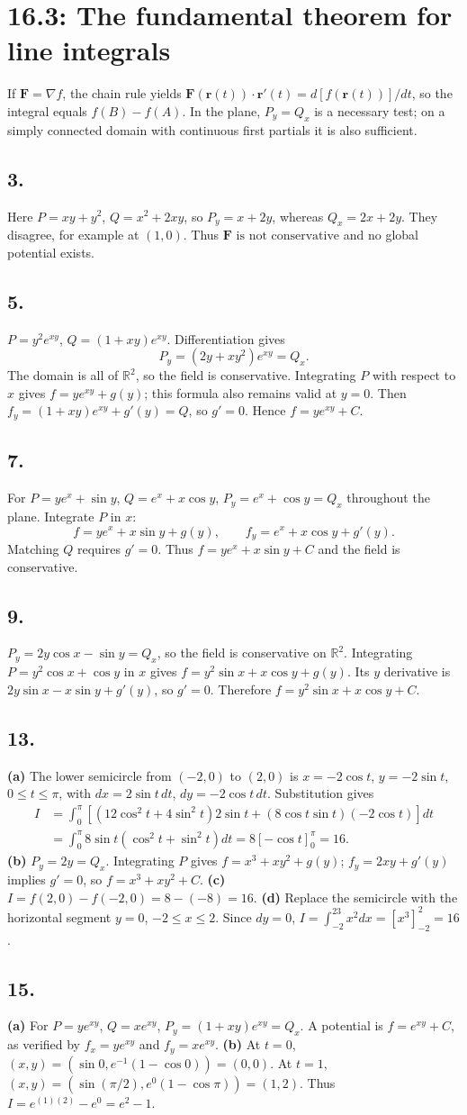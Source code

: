 \documentclass[11pt]{article}
\newcommand{\ex}[1]{\subsection*{#1.}}
\newcommand{\ans}[1]{\boxed{#1}}
\begin{document}
\clearpage\section*{16.3: The fundamental theorem for line integrals}
If $\mathbf F=\nabla f$, the chain rule yields $\mathbf F(\mathbf r(t))\cdot\mathbf r'(t)=d[f(\mathbf r(t))]/dt$, so the integral equals $f(B)-f(A)$. In the plane, $P_y=Q_x$ is a necessary test; on a simply connected domain with continuous first partials it is also sufficient.
\ex{3}
Here $P=xy+y^2$, $Q=x^2+2xy$, so $P_y=x+2y$, whereas $Q_x=2x+2y$. They disagree, for example at $(1,0)$. Thus $\ans{\mathbf F\text{ is not conservative}}$ and no global potential exists.
\ex{5}
$P=y^2e^{xy}$, $Q=(1+xy)e^{xy}$. Differentiation gives
\[P_y=(2y+xy^2)e^{xy}=Q_x.\]
The domain is all of $\mathbb R^2$, so the field is conservative. Integrating $P$ with respect to $x$ gives $f=ye^{xy}+g(y)$; this formula also remains valid at $y=0$. Then $f_y=(1+xy)e^{xy}+g'(y)=Q$, so $g'=0$. Hence $\ans{f=ye^{xy}+C}$.
\ex{7}
For $P=ye^x+\sin y$, $Q=e^x+x\cos y$, $P_y=e^x+\cos y=Q_x$ throughout the plane. Integrate $P$ in $x$:
\[f=ye^x+x\sin y+g(y),\qquad f_y=e^x+x\cos y+g'(y).\]
Matching $Q$ requires $g'=0$. Thus $\ans{f=ye^x+x\sin y+C}$ and the field is conservative.
\ex{9}
$P_y=2y\cos x-\sin y=Q_x$, so the field is conservative on $\mathbb R^2$. Integrating $P=y^2\cos x+\cos y$ in $x$ gives $f=y^2\sin x+x\cos y+g(y)$. Its $y$ derivative is $2y\sin x-x\sin y+g'(y)$, so $g'=0$. Therefore $\ans{f=y^2\sin x+x\cos y+C}$.
\ex{13}
\textbf{(a)} The lower semicircle from $(-2,0)$ to $(2,0)$ is $x=-2\cos t$, $y=-2\sin t$, $0\le t\le\pi$, with $dx=2\sin t\,dt$, $dy=-2\cos t\,dt$. Substitution gives
\begin{align*}
I&=\int_0^\pi[(12\cos^2t+4\sin^2t)2\sin t+(8\cos t\sin t)(-2\cos t)]dt\\
&=\int_0^\pi8\sin t(\cos^2t+\sin^2t)dt
=8[-\cos t]_0^\pi=\ans{16}.
\end{align*}
\textbf{(b)} $P_y=2y=Q_x$. Integrating $P$ gives $f=x^3+xy^2+g(y)$; $f_y=2xy+g'(y)$ implies $g'=0$, so $\ans{f=x^3+xy^2+C}$.
\textbf{(c)} $I=f(2,0)-f(-2,0)=8-(-8)=\ans{16}$.
\textbf{(d)} Replace the semicircle with the horizontal segment $y=0$, $-2\le x\le2$. Since $dy=0$, $I=\int_{-2}^23x^2dx=[x^3]_{-2}^2=\ans{16}$.
\ex{15}
\textbf{(a)} For $P=ye^{xy}$, $Q=xe^{xy}$, $P_y=(1+xy)e^{xy}=Q_x$. A potential is $f=e^{xy}+C$, as verified by $f_x=ye^{xy}$ and $f_y=xe^{xy}$.
\textbf{(b)} At $t=0$, $(x,y)=(\sin0,e^{-1}(1-\cos0))=(0,0)$. At $t=1$, $(x,y)=(\sin(\pi/2),e^0(1-\cos\pi))=(1,2)$. Thus $I=e^{(1)(2)}-e^0=\ans{e^2-1}$.
\end{document}
